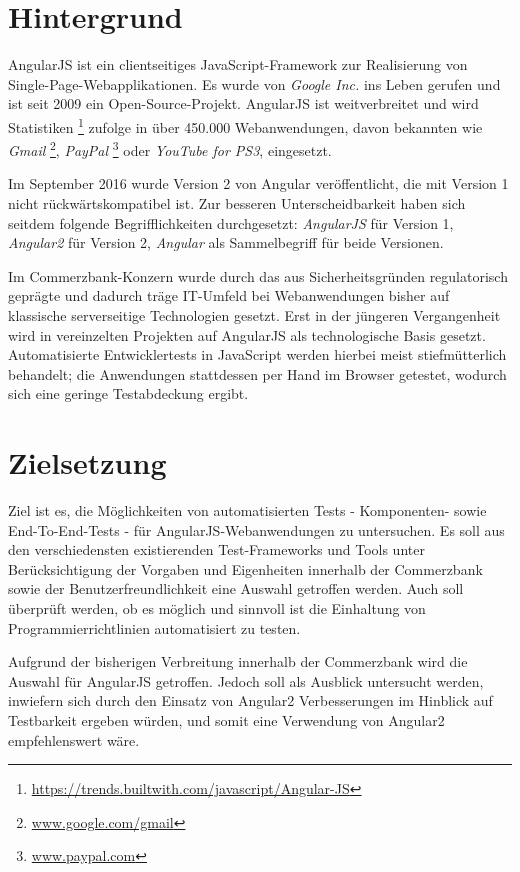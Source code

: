 \section{Hintergrund}\label{einleitung}
AngularJS ist ein clientseitiges JavaScript-Framework zur Realisierung von Single-Page-Webapplikationen. Es wurde von \textit{Google Inc.} ins Leben gerufen und ist seit 2009 ein Open-Source-Projekt. AngularJS ist weitverbreitet und wird Statistiken \footnote{\url{https://trends.builtwith.com/javascript/Angular-JS}} zufolge in über 450.000 Webanwendungen, davon bekannten wie \textit{Gmail} \footnote{\url{www.google.com/gmail}}, \textit{PayPal} \footnote{\url{www.paypal.com}} oder \textit{YouTube for PS3}, eingesetzt.

Im September 2016 wurde Version 2 von Angular veröffentlicht, die mit Version 1 nicht rückwärtskompatibel ist. Zur besseren Unterscheidbarkeit haben sich seitdem folgende Begrifflichkeiten durchgesetzt: \textit{AngularJS} für Version 1, \textit{Angular2} für Version 2, \textit{Angular} als Sammelbegriff für beide Versionen.

Im Commerzbank-Konzern wurde durch das aus Sicherheitsgründen regulatorisch geprägte und dadurch träge IT-Umfeld bei Webanwendungen bisher auf klassische serverseitige Technologien gesetzt. Erst in der jüngeren Vergangenheit wird in vereinzelten Projekten auf AngularJS als technologische Basis gesetzt. Automatisierte Entwicklertests in JavaScript werden hierbei meist stiefmütterlich behandelt; die Anwendungen stattdessen per Hand im Browser getestet, wodurch sich eine geringe Testabdeckung ergibt.

\section{Zielsetzung}
Ziel ist es, die Möglichkeiten von automatisierten Tests - Komponenten- sowie End-To-End-Tests - für AngularJS-Webanwendungen zu untersuchen. Es soll aus den verschiedensten existierenden Test-Frameworks und Tools unter Berücksichtigung der Vorgaben und Eigenheiten innerhalb der Commerzbank sowie der Benutzerfreundlichkeit eine Auswahl getroffen werden. Auch soll überprüft werden, ob es möglich und sinnvoll ist die Einhaltung von Programmierrichtlinien automatisiert zu testen.

Aufgrund der bisherigen Verbreitung innerhalb der Commerzbank wird die Auswahl für AngularJS getroffen. Jedoch soll als Ausblick untersucht werden, inwiefern sich durch den Einsatz von Angular2 Verbesserungen im Hinblick auf Testbarkeit ergeben würden, und somit eine Verwendung von Angular2 empfehlenswert wäre.


